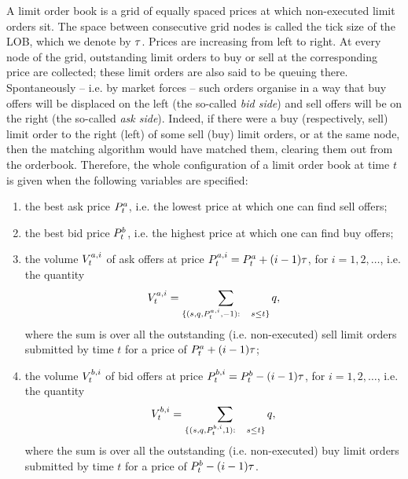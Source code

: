 \documentclass[10pt, article,table]{article}
\begin{document}
A limit order book is a grid of equally spaced prices at which non-executed limit orders sit. The space between consecutive grid nodes is called the tick size of the LOB, which we denote by $\tickSizeOfLOB$. Prices are increasing from left to right. At every node of the grid, outstanding limit orders to buy or sell at the corresponding price are collected; these limit orders are also said to be queuing there. Spontaneously -- i.e. by market forces  -- such orders organise in a way that buy offers will be displaced on the left (the so-called \emph{bid side}) and sell offers will be on the right (the so-called \emph{ask side}). Indeed, if there were a buy (respectively, sell) limit order to the right (left) of some sell (buy) limit orders, or at the same node, then the matching algorithm would have matched them, clearing them out from the orderbook.  Therefore, the whole configuration of a limit order book at time $t$ is given when the following variables are specified:
\begin{enumerate}
\item the best ask price $\bestAskPrice_{t}$, i.e. the lowest price at which one can find sell offers;
\item the best bid price $\bestBidPrice_t$, i.e. the highest price at which one can find buy offers;
\item the volume $\nthBestAskVolume[i]_t$ of ask offers at price $\nthBestAskPrice[i]_t= \bestAskPrice_t + (i-1)\tickSizeOfLOB$, for $i=1,2,\dots$, i.e. the quantity 
\begin{equation*}
 \nthBestAskVolume[i]_t = \sum_{\lbrace(s,q,\nthBestAskPrice[i]_t,-1): \quad s\leq t\rbrace} q,
\end{equation*}
where the sum is over all the outstanding (i.e. non-executed) sell limit orders submitted by time $t$ for  a price of $\bestAskPrice_t + (i-1)\tickSizeOfLOB$;
\item the volume $\nthBestBidVolume[i]_t$ of bid offers at price $\nthBestBidPrice[i]_t=\bestBidPrice_t - (i-1)\tickSizeOfLOB$, for $i=1,2,\dots$, i.e. the quantity 
\begin{equation*}
 \nthBestBidVolume[i]_t = \sum_{\lbrace (s,q,\nthBestBidPrice[i]_t,1): \quad s\leq t\rbrace} q,
\end{equation*}
where the sum is over all the outstanding (i.e. non-executed) buy limit orders submitted by time $t$ for  a price of $\bestBidPrice_t - (i-1)\tickSizeOfLOB$.
\end{enumerate} 

\end{document}
